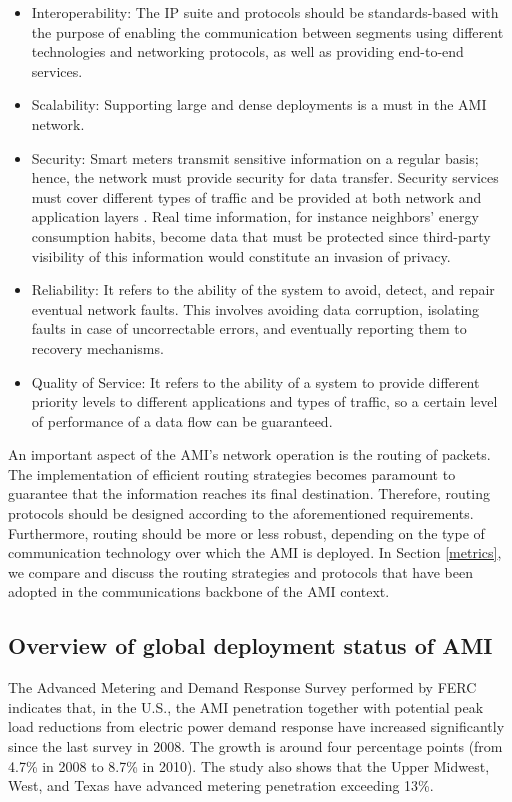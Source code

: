 \documentclass[11pt,draftclsnofoot,onecolumn]{IEEEtran}
\begin{document}
\begin{itemize}
\item Interoperability: The IP suite and protocols should be standards-based with the purpose of enabling the communication between segments using different technologies and networking protocols, as well as providing end-to-end services.
\item Scalability: Supporting large and dense deployments is a must in the AMI network. 
\item Security: Smart meters transmit sensitive information on a regular basis; hence, the network must provide security for data transfer. Security services must cover different types of traffic and be provided at both network and application layers \cite{Bennett2008}. Real time information, for instance neighbors' energy consumption habits, become data that must be protected since third-party visibility of this information would constitute an invasion of privacy.
\item Reliability: It refers to the ability of the system to avoid, detect, and repair eventual network faults. This involves avoiding data corruption, isolating faults in case of uncorrectable errors, and eventually reporting them to recovery mechanisms.
\item Quality of Service: It refers to the ability of a system to provide different priority levels to different applications and types of traffic, so a certain level of performance of a data flow can be guaranteed.
\end{itemize}

An important aspect of the AMI's network operation is the routing of packets. The implementation of efficient routing strategies becomes paramount to guarantee that the information reaches its final destination. Therefore, routing protocols should be designed according to the aforementioned requirements. Furthermore, routing should be more or less robust, depending on the type of communication technology over which the AMI is deployed. In Section \ref{metrics}, we compare and discuss the routing strategies and protocols that have been adopted in the communications backbone of the AMI context.

\subsection{Overview of global deployment status of AMI}\label{overview}

The Advanced Metering and Demand Response Survey performed by FERC \cite{FERC2012} indicates that, in the U.S., the AMI penetration together with potential peak load reductions from electric power demand response have increased significantly since the last survey in 2008. The growth is around four percentage points (from 4.7\% in 2008 to 8.7\% in 2010). The study also shows that the Upper Midwest, West, and Texas have advanced metering penetration exceeding 13\%.
\end{document}

